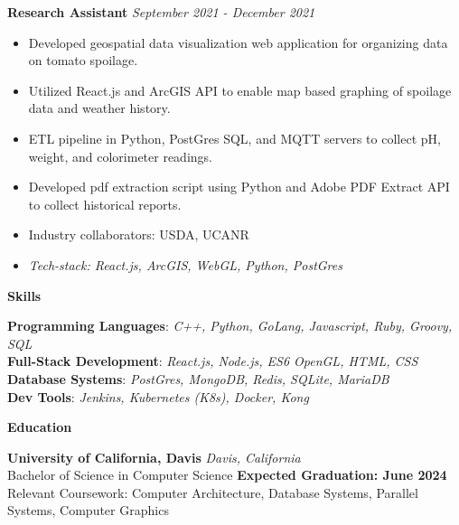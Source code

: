 \documentclass[11pt]{article}
\begin{document}
\textbf{Research Assistant} \hfill \textit{September 2021 - December 2021}
\begin{itemize}[noitemsep, topsep=0pt, partopsep=0pt, parsep=0pt]
    \item {Developed geospatial data visualization web application for organizing data on tomato spoilage.}
    \item {Utilized React.js and ArcGIS API to enable map based graphing of spoilage data and weather history.}
    \item {ETL pipeline in Python, PostGres SQL, and MQTT servers to collect pH, weight, and colorimeter readings.}
    \item {Developed pdf extraction script using Python and Adobe PDF Extract API to collect historical reports.}
    \item {Industry collaborators: USDA, UCANR}
    \item \textit{Tech-stack: React.js, ArcGIS, WebGL, Python, PostGres}
\end{itemize}


\begin{center}
    \textbf{Skills}
\end{center}

\textbf{Programming Languages}: \textit{C++, Python, GoLang, Javascript, Ruby, Groovy, SQL}\\
\textbf{Full-Stack Development}: \textit{React.js, Node.js, ES6 OpenGL, HTML, CSS}\\
\textbf{Database Systems}: \textit{PostGres, MongoDB, Redis, SQLite, MariaDB}\\
\textbf{Dev Tools}: \textit{Jenkins, Kubernetes (K8s), Docker, Kong}


\begin{center}
    \textbf{Education}
\end{center}
\textbf{University of California, Davis} \hfill \textit{Davis, California}\\
Bachelor of Science in Computer Science \hfill \textbf{Expected Graduation: June 2024}\\
Relevant Coursework: Computer Architecture, Database Systems, Parallel Systems, Computer Graphics
\vspace{8pt}
\end{document}
